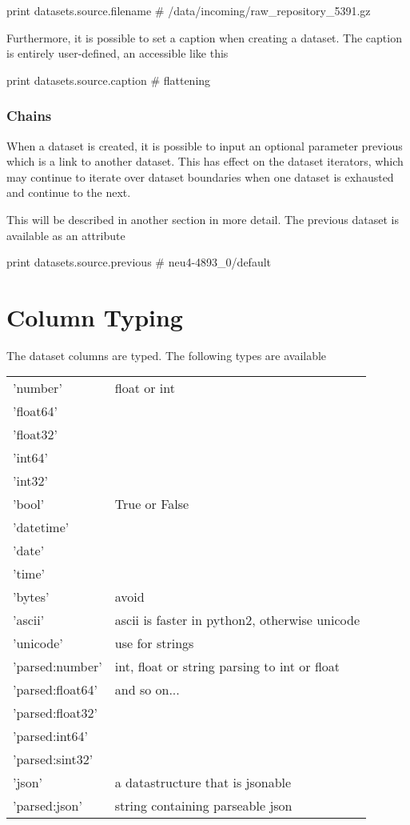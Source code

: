 \begin{python}
print datasets.source.filename
# /data/incoming/raw_repository_5391.gz
\end{python}
Furthermore, it is possible to set a caption when creating a dataset.
The caption is entirely user-defined, an accessible like this

\begin{python}
print datasets.source.caption
# flattening
\end{python}



\subsubsection{Chains}

When a dataset is created, it is possible to input an optional
parameter previous which is a link to another dataset.  This has
effect on the dataset iterators, which may continue to iterate over
dataset boundaries when one dataset is exhausted and continue to the
next.

This will be described in another section in more detail.  The
previous dataset is available as an attribute

\begin{python}
print datasets.source.previous
# neu4-4893_0/default
\end{python}



\newpage
\section{Column Typing}
The dataset columns are typed.  The following types are available

\begin{tabular}{ll}
	'number'   &  float or int\\
	'float64'   &\\
	'float32'   &\\
	'int64'   & \\
	'int32'   &  \\
	'bool'   &  True or False\\
	'datetime'   &  \\
	'date'   &  \\
	'time'   &  \\
	'bytes'   &  avoid \\
	'ascii'   &  ascii is faster in python2, otherwise unicode\\
	'unicode'   &  use for strings\\
	'parsed:number'   & int, float or string parsing to int or float \\
	'parsed:float64'   &  and so on...\\
	'parsed:float32'   &  \\
	'parsed:int64'   &  \\
	'parsed:sint32'   &  \\
        'json'   &  a datastructure that is jsonable\\
        'parsed:json'   &  string containing parseable json\\
\end{tabular}


